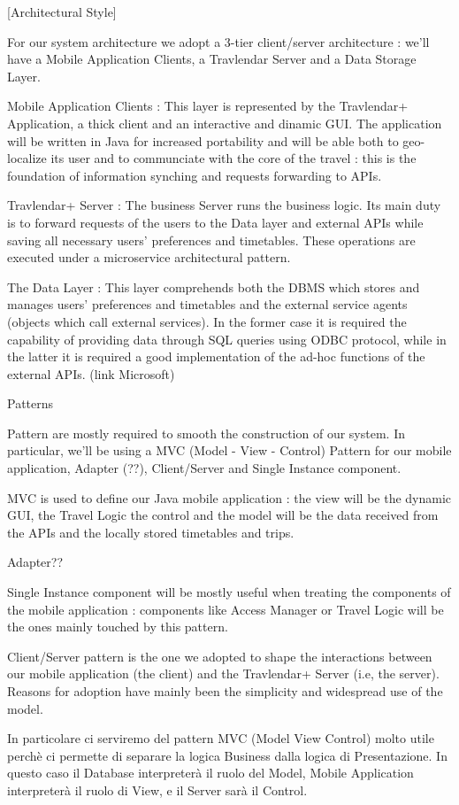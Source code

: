 
[Architectural Style]

For our system architecture we adopt a 3-tier client/server architecture : we'll have a Mobile Application Clients, a Travlendar
 Server and a Data Storage Layer.


Mobile Application Clients : This layer is represented by the Travlendar+ Application, a thick client and an interactive and dinamic GUI.
The application will be written in Java for increased portability and will be able both to geo-localize its user and to communciate with the core of the travel : this is the foundation of information synching and requests forwarding to APIs.

Travlendar+ Server : The business Server runs the business logic. Its main duty is to forward requests of the users to the Data layer and external APIs while saving all necessary users' preferences and timetables. These operations are executed under a microservice architectural pattern.

The Data Layer : This layer comprehends both the DBMS which stores and manages users' preferences and timetables and the external service agents (objects which call external services). In the former case it is required the capability of providing data through SQL queries using ODBC protocol, while in the latter it is required a good implementation of the ad-hoc functions of the external APIs.
(link Microsoft)

Patterns

Pattern are mostly required to smooth the construction of our system. In particular, we'll be using a MVC (Model - View - Control) Pattern for our mobile application, Adapter (??), Client/Server and Single Instance component.

MVC is used to define our Java mobile application : the view will be the dynamic GUI, the Travel Logic the control and the model will be the data received from the APIs and the locally stored timetables and trips.

Adapter??

Single Instance component will be mostly useful when treating the components of the mobile application : components like Access Manager or Travel Logic will be the ones mainly touched by this pattern.

Client/Server pattern is the one we adopted to shape the interactions between our mobile application (the client) and the Travlendar+ Server (i.e, the server). Reasons for adoption have mainly been the simplicity and widespread use of the model.


In particolare ci serviremo del pattern MVC (Model View Control) molto utile perchè ci permette di separare la logica Business dalla logica di Presentazione. In questo caso il Database interpreterà il ruolo del Model, Mobile Application interpreterà il ruolo di View, e il Server sarà il Control. 
